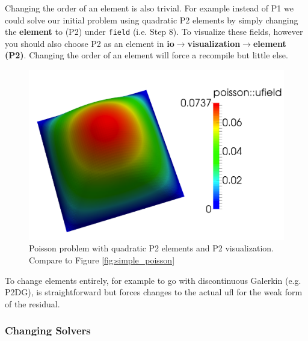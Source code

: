 Changing the order of an element is also trivial. For example
instead of P1 we could solve our initial problem using quadratic P2
elements by simply changing the \textbf{element} to (P2) under
\texttt{field} (i.e. Step 8).  To visualize these fields, however you
should also choose P2 as an element in
\textbf{io}$\rightarrow$\textbf{visualization}$\rightarrow$\textbf{element
(P2)}.  Changing the order of an element will force a recompile but
little else.
\begin{figure}[ht!]
  \centering
  \includegraphics[width=.7\textwidth]{figures/poisson_simple_p2}
  \caption{Poisson problem with quadratic P2 elements and P2
    visualization. Compare to Figure \ref{fig:simple_poisson}}
  \label{fig:poisson-P2}
\end{figure}

To change elements entirely, for example to go with discontinuous
Galerkin (e.g. P2DG), is straightforward but forces changes to the
actual ufl for the weak form of the residual.

\subsubsection{Changing Solvers}
\label{sec:changing-solvers}

